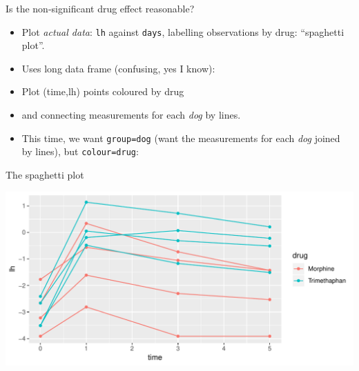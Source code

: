 \begin{frame}[fragile]{Is the non-significant drug effect reasonable?}
  
  \begin{itemize}
  \item Plot \emph{actual data}: \texttt{lh} against \texttt{days},
    labelling observations by drug: ``spaghetti plot''.
  \item Uses long data frame (confusing, yes I know):
 

\item Plot (time,lh) points coloured  by drug
\item and connecting measurements for each \emph{dog} by lines.

  
\item This time, we want \texttt{group=dog} (want the measurements for each
\emph{dog} joined by lines), but \texttt{colour=drug}:
  
\begin{knitrout}
\color{fgcolor}\begin{kframe}
\begin{alltt}
\hlkwb{=}\hlstd{(}
     \hlopt{+}
  \hlstd{()}\hlopt{+}\hlstd{()}
\end{alltt}
\end{kframe}
\end{knitrout}
\end{itemize}
  
\end{frame}

\begin{frame}[fragile]{The spaghetti plot}
  
\begin{knitrout}
\color{fgcolor}\begin{kframe}
\begin{alltt}
\end{alltt}
\end{kframe}
\includegraphics[width=\maxwidth]{figure/hoverla-1} 

\end{knitrout}
  
\end{frame}

